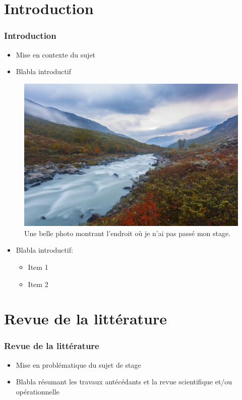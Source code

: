 \documentclass[9pt,french,xcolor=table]{beamer}
\begin{document}
\section{Introduction}
    \begin{frame}[c]
        \frametitle{\vspace*{0.45cm} \huge \bf Introduction}
        \vspace*{0.45cm}
        \begin{itemize}
            \item Mise en contexte du sujet
            \item Blabla introductif
        \end{itemize}
        \begin{multicols}{2}
            \begin{figure}
                \centering
                \includegraphics[width=0.8\linewidth]{./img/image.jpg}
                \caption{Une belle photo montrant l'endroit où je n'ai pas passé mon stage.}
            \end{figure}
            \columnbreak
            \begin{itemize}
                \item Blabla introductif:
                \begin{itemize}
                    \item Item 1
                    \item Item 2
                \end{itemize}
            \end{itemize}
        \end{multicols}
    \end{frame}
    
\section{Revue de la littérature}
    \begin{frame}[c]
        \frametitle{\vspace*{0.45cm} \huge \bf Revue de la littérature}
        \begin{itemize}
            \item Mise en problématique du sujet de stage
            \item Blabla résumant les travaux antécédants et la revue scientifique et/ou opérationnelle
        \end{itemize}
    \end{frame}
    
\end{document}
